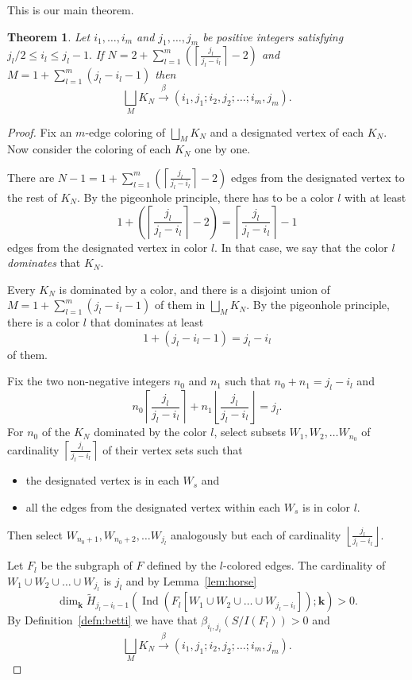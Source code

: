 \documentclass{article}
\theoremstyle{plain}
\newtheorem{thm}{Theorem}
\theoremstyle{definition}
\begin{document}
This is our main theorem.
\begin{thm}\label{thm:main}
Let $i_1,\ldots,i_m$ and $j_1,\ldots, j_m$ be positive integers satisfying $j_l/2 \leq i_l \leq j_l-1.$ If
$N=2+\sum_{l=1}^m \left( \left\lceil \frac{j_l}{j_l-i_l} \right\rceil -2 \right)$
and $M=1+\sum_{l=1}^m (j_l-i_l-1)$
then
\[ \bigsqcup_M K_N \xrightarrow{\beta} (i_1,j_1;i_2,j_2;\ldots;i_m,j_m ). \]
\end{thm}
\begin{proof}
Fix an $m$-edge coloring of $\bigsqcup_M K_N$ and a designated vertex of each $K_N.$ Now consider the coloring of each $K_N$ one by one.

There are $N-1=1+\sum_{l=1}^m \left( \left\lceil \frac{j_l}{j_l-i_l} \right\rceil -2 \right)$ edges from the designated vertex to the rest of $K_N.$ By the pigeonhole principle, there has to be a color $l$ with at least 
\[ 1 +  \left( \left\lceil \frac{j_l}{j_l-i_l} \right\rceil -2 \right) =   \left\lceil \frac{j_l}{j_l-i_l} \right\rceil -1 \]
edges from the designated vertex in color $l.$ In that case, we say that the color $l$ \emph{dominates} that $K_N.$

Every $K_N$ is dominated by a color, and there is a disjoint union of $M=1+\sum_{l=1}^m (j_l-i_l-1)$ of them in $\bigsqcup_M K_N.$ By the pigeonhole principle, there is a color $l$ that dominates at least
\[1 + (j_l-i_l-1) = j_l-i_l \] of them.

Fix the two non-negative integers $n_0$ and $n_1$ such that $n_0+n_1= j_l-i_l$ and
\[n_0  \left\lceil \frac{j_l}{j_l-i_l} \right\rceil + n_1 \left\lfloor \frac{j_l}{j_l-i_l} \right\rfloor = j_l.
\]
For $n_0$ of the $K_N$ dominated by the color $l$, select subsets $W_1,W_2, \ldots W_{n_0}$ of cardinality $\left\lceil \frac{j_l}{j_l-i_l} \right\rceil$ of their vertex sets such that
\begin{itemize}
\item[-] the designated vertex is in each $W_s$ and
\item[-] all the edges from the designated vertex within each $W_s$ is in color $l.$
\end{itemize}
Then select $W_{n_0+1},W_{n_0+2}, \ldots W_{j_l}$ analogously but each of cardinality $\left\lfloor \frac{j_l}{j_l-i_l} \right\rfloor.$ 

Let $F_l$ be the subgraph of $F$ defined by the $l$-colored edges. The cardinality of $W_1 \cup W_2 \cup \ldots \cup W_{j_l}$ is $j_l$ and by Lemma~\ref{lem:horse}
\[
\dim_{\mathbf{k} }  \widetilde{H}_{j_l-i_l-1}(  \operatorname{Ind}(F_l[W_1 \cup W_2 \cup \ldots \cup W_{j_l-i_l}]) ; {\mathbf{k} } )>0.
 \]
By Definition~\ref{defn:betti} we have that $\beta_{i_l,j_i}(S/I(F_l)) >0$ and 
\[\bigsqcup_M K_N \xrightarrow{\beta} (i_1,j_1;i_2,j_2;\ldots;i_m,j_m ).\]
\end{proof}
\end{document}
